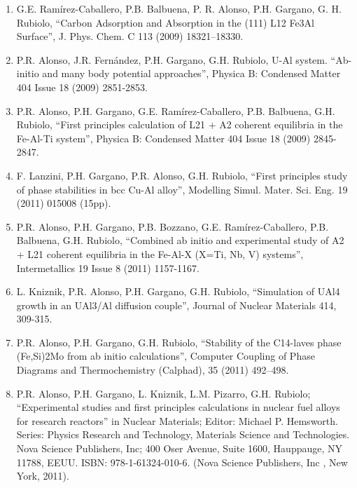\begin{enumerate}
\item  G.E. Ramírez-Caballero, P.B. Balbuena, P. R. Alonso, P.H. Gargano, G. 
H. Rubiolo, ``Carbon Adsorption and Absorption in the (111) L12 Fe3Al Surface'', J. 
Phys. Chem. C 113 (2009) 18321–18330.

\item  P.R. Alonso, J.R. Fernández, P.H. Gargano, G.H. Rubiolo, U-Al system. 
``Ab-initio and many body potential approaches'', Physica B: Condensed Matter 404 
Issue 18 (2009) 2851-2853.

\item P.R. Alonso, P.H. Gargano, G.E. Ramírez-Caballero, P.B. Balbuena, G.H. 
Rubiolo, ``First principles calculation of L21 + A2 coherent equilibria in the 
Fe-Al-Ti system'', Physica B: Condensed Matter 404 Issue 18 (2009) 2845-2847. 

\item  F. Lanzini, P.H. Gargano, P.R. Alonso, G.H. Rubiolo, ``First principles 
study of phase stabilities in bcc Cu-Al alloy'', Modelling Simul. Mater. Sci. 
Eng. 19 (2011) 015008 (15pp).

\item  P.R. Alonso, P.H. Gargano, P.B. Bozzano, G.E. Ramírez-Caballero, P.B. 
Balbuena, G.H. Rubiolo, ``Combined ab initio and experimental study of A2 + L21 
coherent equilibria in the Fe-Al-X (X=Ti, Nb, V) systems'', Intermetallics 19 
Issue 8 (2011) 1157-1167. 

\item  L. Kniznik, P.R. Alonso, P.H. Gargano, G.H. Rubiolo, ``Simulation of 
UAl4 growth in an UAl3/Al diffusion couple'', Journal of Nuclear Materials 414, 
    309-315. 

\item  P.R. Alonso, P.H. Gargano, G.H. Rubiolo, ``Stability of the C14-laves 
phase (Fe,Si)2Mo from ab initio calculations'', Computer Coupling of Phase 
Diagrams and Thermochemistry (Calphad), 35 (2011) 492–498. 

\item  P.R. Alonso, P.H. Gargano, L. Kniznik, L.M. Pizarro, G.H. Rubiolo; 
``Experimental studies and first principles calculations in nuclear fuel alloys 
for research reactors'' in Nuclear Materials; Editor: Michael P. Hemsworth. 
Series: Physics Research and Technology, Materials Science and Technologies. 
Nova Science Publishers, Inc; 400 Oser Avenue, Suite 1600, Hauppauge, NY 11788, 
EEUU. ISBN: 978-1-61324-010-6. (Nova Science Publishers, Inc , New York, 2011).


\end{enumerate}
